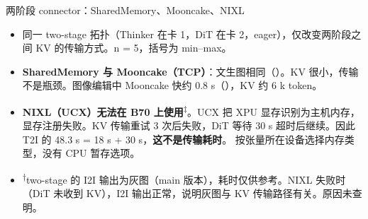 \begin{frame}[t]{两阶段 connector：SharedMemory、Mooncake、NIXL}
\scriptsize\def\codesize{\relax}
\renewcommand{\arraystretch}{1.12}\setlength{\tabcolsep}{3pt}

\vspace{3pt}
\begin{itemize}\scriptsize\setlength\itemsep{1.5pt}
  \item 同一 two-stage 拓扑（Thinker 在卡 1，DiT 在卡 2，eager），仅改变两阶段之间 KV 的传输方式。n = 5，括号为 min--max。
  \item \textbf{SharedMemory 与 Mooncake（TCP）}：文生图相同（）。KV 很小，传输不是瓶颈。图像编辑中 Mooncake 快约 0.8 s（），KV 约 6 k token。
  \item \textbf{NIXL（UCX）无法在 B70 上使用}\textsuperscript{‡}。UCX 把 XPU 显存识别为主机内存，显存注册失败。KV 传输重试 3 次后失败，DiT 等待 30 s 超时后继续。因此 T2I 的 48.3 s = 18 s + 30 s，\textbf{这不是传输耗时}。 按张量所在设备选择内存类型，没有 CPU 暂存选项。
  \item \textsuperscript{†}two-stage 的 I2I 输出为灰图（main 版本），耗时仅供参考。NIXL 失败时（DiT 未收到 KV），I2I 输出正常，说明灰图与 KV 传输路径有关。原因未查明。
\end{itemize}
\end{frame}


